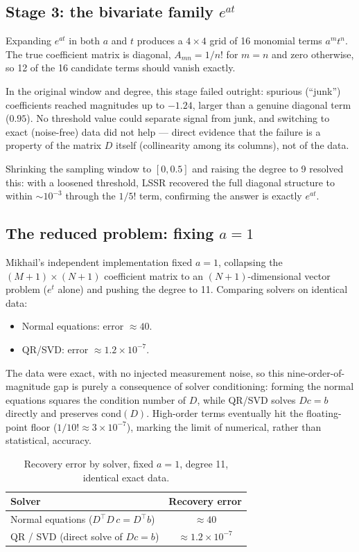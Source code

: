 \documentclass[11pt]{article}
\begin{document}
\subsection{Stage 3: the bivariate family $e^{at}$}

Expanding $e^{at}$ in both $a$ and $t$ produces a $4\times 4$ grid of 16 monomial terms
$a^m t^n$. The true coefficient matrix is diagonal, $A_{mn} = 1/n!$ for $m=n$ and zero
otherwise, so 12 of the 16 candidate terms should vanish exactly.

In the original window and degree, this stage failed outright: spurious (``junk'')
coefficients reached magnitudes up to $-1.24$, larger than a genuine diagonal term
($0.95$). No threshold value could separate signal from junk, and switching to exact
(noise-free) data did not help --- direct evidence that the failure is a property of the
matrix $D$ itself (collinearity among its columns), not of the data.

Shrinking the sampling window to $[0, 0.5]$ and raising the degree to 9 resolved this:
with a loosened threshold, LSSR recovered the full diagonal structure to within
$\sim 10^{-3}$ through the $1/5!$ term, confirming the answer is exactly $e^{at}$.

\subsection{The reduced problem: fixing $a=1$}

Mikhail's independent implementation fixed $a=1$, collapsing the $(M+1)\times(N+1)$
coefficient matrix to an $(N+1)$-dimensional vector problem ($e^{t}$ alone) and pushing
the degree to 11. Comparing solvers on identical data:
\begin{itemize}
  \item Normal equations: error $\approx 40$.
  \item QR/SVD: error $\approx 1.2 \times 10^{-7}$.
\end{itemize}
The data were exact, with no injected measurement noise, so this nine-order-of-magnitude
gap is purely a consequence of solver conditioning: forming the normal equations squares
the condition number of $D$, while QR/SVD solves $Dc=b$ directly and preserves
$\mathrm{cond}(D)$. High-order terms eventually hit the floating-point floor
($1/10! \approx 3\times 10^{-7}$), marking the limit of numerical, rather than
statistical, accuracy.

\begin{table}[h]
\centering
\caption{Recovery error by solver, fixed $a=1$, degree 11, identical exact data.}
\label{tab:solver-comparison}
\begin{tabular}{@{}lc@{}}
\toprule
Solver & Recovery error \\
\midrule
Normal equations ($D^{\top}D\, c = D^{\top}b$) & $\approx 40$ \\
QR / SVD (direct solve of $Dc=b$)              & $\approx 1.2 \times 10^{-7}$ \\
\bottomrule
\end{tabular}
\end{table}
\end{document}
